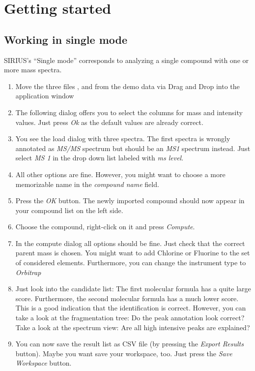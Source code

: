 \documentclass[letterpaper,10pt,openany,oneside]{sphinxmanual}
\newcommand\gui[1]{\textsl{\guilsinglleft#1\guilsinglright\xspace}}
\begin{document}

\section{Getting started}

\subsection{Working in single mode}
\label{gui:working-in-single-mode}

SIRIUS's ``Single mode'' corresponds to analyzing a single compound with
one or more mass spectra.

\begin{enumerate}
\item {} 
Move the three files ,  and  from the demo data via Drag and Drop into the application window

\item {} 
The following dialog offers you to select the columns for mass and intensity values. Just press \gui{Ok} as the default values are already correct.

\item {} 
You see the load dialog with three spectra. The first spectra is wrongly
annotated as \emph{MS/MS} spectrum but should be an \emph{MS1} spectrum
instead. Just select \gui{MS 1} in the drop down list labeled with \gui{ms
level}.

\item {} 
All other options are fine. However, you might want to choose a more memorizable name in the \gui{compound name} field.

\item {} 
Press the \gui{OK} button. The newly imported compound should now appear in your compound list on the left side.

\item {} 
Choose the compound, right-click on it and press \gui{Compute}.

\item {} 
In the compute dialog all options should be fine. Just check that the correct parent mass is chosen. You might want to add Chlorine or Fluorine to the set of considered elements. Furthermore, you can change the instrument type to \gui{Orbitrap}

\item {} 
Just look into the candidate list: The first molecular formula has a quite large score. Furthermore, the second molecular formula has a much lower score. This is a good indication that the identification is correct. However, you can take a look at the fragmentation tree: Do the peak annotation look correct? Take a look at the spectrum view: Are all high intensive peaks are explained?

\item {} 
You can now save the result list as CSV file (by pressing the \gui{Export Results} button). Maybe you want save your workspace, too. Just press the \gui{Save Workspace} button.

\end{enumerate}
\end{document}
